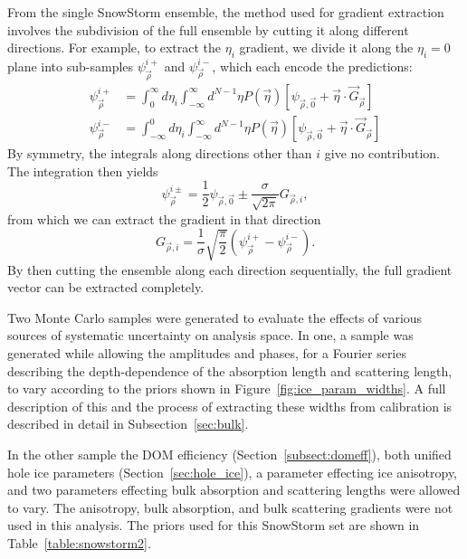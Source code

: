 \documentclass[main.tex]{subfiles}
\begin{document}
From the single SnowStorm ensemble, the method used for gradient extraction involves the subdivision of the full ensemble by cutting it along different directions.
For example, to extract the $\eta_{i}$ gradient, we divide it along the $\eta_{i}=0$ plane into sub-samples $\psi_{\vec{\rho}}^{i+}$ and $\psi_{\vec{\rho}}^{i-}$, which each encode the predictions:
\begin{align} 
    \psi_{\vec{\rho}}^{i+} &= \int_{0}^{\infty}d\eta_{i} \int_{-\infty}^{\infty} d^{N-1} \eta P(\vec{\eta})\left[ \psi_{\vec{\rho}, \vec{0}} + \vec{\eta}\cdot\vec{G}_{\vec{\rho}} \right] \\
    \psi_{\vec{\rho}}^{i-} &= \int_{-\infty}^{0}d\eta_{i} \int_{-\infty}^{\infty} d^{N-1} \eta P(\vec{\eta})\left[ \psi_{\vec{\rho}, \vec{0}} + \vec{\eta}\cdot\vec{G}_{\vec{\rho}} \right] 
\end{align}
By symmetry, the integrals along directions other than $i$ give no contribution. The integration then yields
\begin{equation}
    \psi_{\vec{\rho}}^{i\pm} = \dfrac{1}{2} \psi_{\vec{\rho}, \vec{0}} \pm \dfrac{\sigma}{\sqrt{2\pi}}G_{\vec{\rho}, i},
\end{equation}
from which we can extract the gradient in that direction
\begin{equation}
    G_{\vec{\rho}, i} = \dfrac{1}{\sigma}\sqrt{\dfrac{\pi}{2}}\left(\psi_{\vec{\rho}}^{i+} - \psi_{\vec{\rho}}^{i-} \right).
\end{equation} 
By then cutting the ensemble along each direction sequentially, the full gradient vector can be extracted completely. 


Two Monte Carlo samples were generated to evaluate the effects of various sources of systematic uncertainty on analysis space. 
In one, a sample was generated while allowing the amplitudes and phases, for a Fourier series describing the depth-dependence of the absorption length and scattering length, to vary according to the priors shown in Figure~\ref{fig:ice_param_widths}. 
A full description of this and the process of extracting these widths from calibration is described in detail in Subsection~\ref{sec:bulk}.

In the other sample the DOM efficiency (Section~\ref{subsect:domeff}), both unified hole ice parameters (Section~\ref{sec:hole_ice}), a parameter effecting ice anisotropy, and two parameters effecting bulk absorption and scattering lengths were allowed to vary. 
The anisotropy, bulk absorption, and bulk scattering gradients were not used in this analysis. 
The priors used for this SnowStorm set are shown in Table~\ref{table:snowstorm2}.
\end{document}
